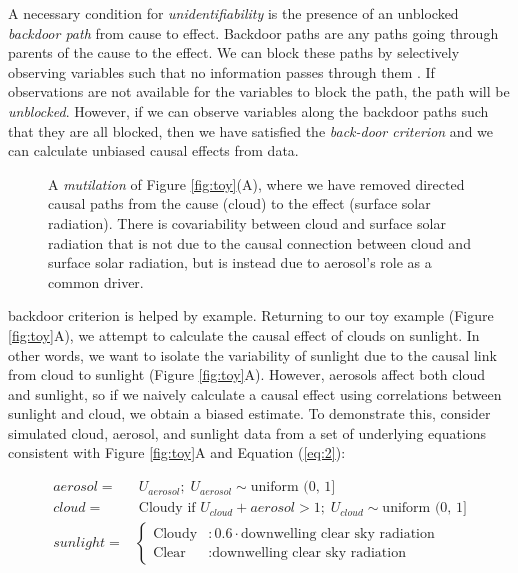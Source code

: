 \documentclass[12pt]{article}
\begin{document}

A necessary condition for \emph{unidentifiability} is the presence of
an unblocked \emph{backdoor path} from cause to effect. Backdoor paths
are any paths going through parents of the cause to the effect. We can
block these paths by selectively observing variables such that no
information passes through them \citep{geiger-d-sep}. If observations
are not available for the variables to block the path, the path will
be \emph{unblocked}. However, if we can observe variables along the
backdoor paths such that they are all blocked, then we have satisfied
the \emph{back-door criterion} \citep{pearl2009} and we can calculate
unbiased causal effects from data.

\begin{figure} 
  \caption{A \emph{mutilation} of Figure \ref{fig:toy}(A), where we have
    removed directed causal paths from the cause (cloud) to the effect
    (surface solar radiation). There is covariability between cloud and
    surface solar radiation that is not due to the causal connection
    between cloud and surface solar radiation, but is instead due to
    aerosol's role as a common driver.}
  \label{fig:mutilated-toy}
\end{figure}

backdoor criterion is helped by example. Returning to our toy example
(Figure \ref{fig:toy}A), we attempt to calculate the causal effect of
clouds on sunlight. In other words, we want to isolate the variability
of sunlight due to the causal link from cloud to sunlight (Figure
\ref{fig:toy}A). However, aerosols affect both cloud and sunlight, so
if we naively calculate a causal effect using correlations between
sunlight and cloud, we obtain a biased estimate. To demonstrate this,
consider simulated cloud, aerosol, and sunlight data from a set of
underlying equations consistent with Figure \ref{fig:toy}A and
Equation (\ref{eq:2}):


\begin{align} aerosol =& \; U_{aerosol}; \; U_{aerosol} \sim
                         \text{uniform (0, 1]}\\ cloud =& \; \text{Cloudy if } U_{cloud} +
                                                          aerosol > 1; \; U_{cloud} \sim \text{uniform (0, 1]}\\ sunlight
  =& \begin{cases} \text{Cloudy} &: 0.6 \cdot \text{downwelling clear
      sky radiation} \\ \text{Clear} &: \text{downwelling clear sky
      radiation}
  \end{cases}
                                       \label{eq:1}
\end{align}
\end{document}
